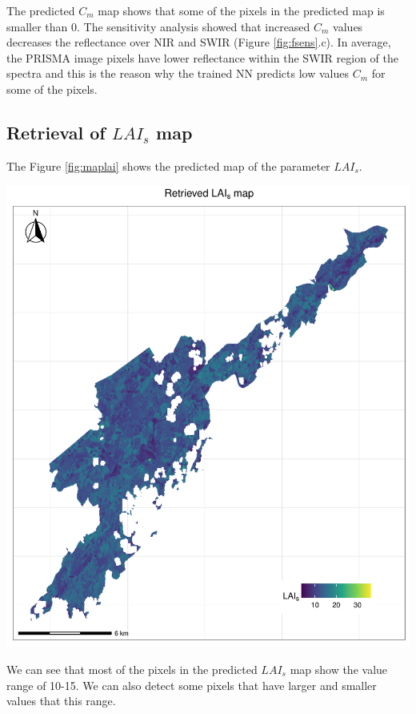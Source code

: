 \documentclass[a4paper, twoside]{templates/ociamthesis}
\let\origfigure\figure
\let\endorigfigure\endfigure
\renewenvironment{figure}[1][2] {
    \expandafter\origfigure\expandafter[H]
} {
    \endorigfigure
}
\begin{document}
The predicted \(C_{m}\) map shows that some of the pixels in the predicted map is smaller than 0. The sensitivity analysis showed that increased \(C_{m}\) values decreases the reflectance over NIR and SWIR (Figure \ref{fig:fsens}.c). In average, the PRISMA image pixels have lower reflectance within the SWIR region of the spectra and this is the reason why the trained NN predicts low values \(C_{m}\) for some of the pixels.

\hypertarget{retrieval-of-lai_s-map}{%
\subsection{\texorpdfstring{Retrieval of \(LAI_{s}\) map}{Retrieval of LAI\_\{s\} map}}\label{retrieval-of-lai_s-map}}

The Figure \ref{fig:maplai} shows the predicted map of the parameter \(LAI_{s}\).

\begin{figure}
\includegraphics[width=0.9\linewidth]{./figures/lais_map} \caption{Predicted map of the parameter $LAI_{s}$}\label{fig:maplai}
\end{figure}

We can see that most of the pixels in the predicted \(LAI_{s}\) map show the value range of 10-15. We can also detect some pixels that have larger and smaller values that this range.
\end{document}
